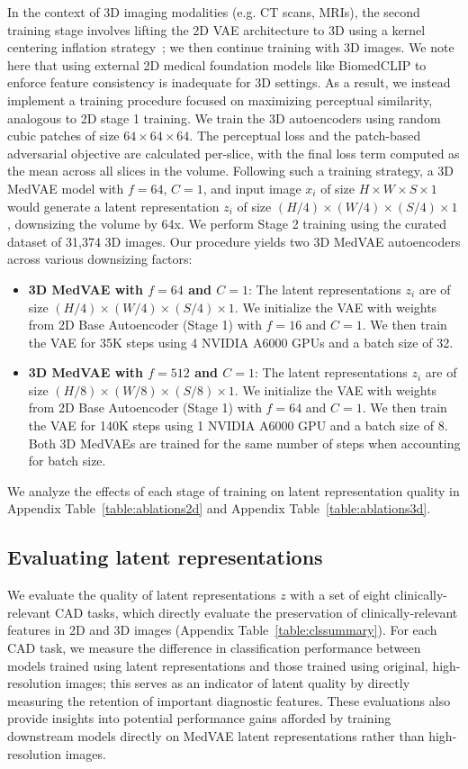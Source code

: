 In the context of 3D imaging modalities (e.g. CT scans, MRIs), the second training stage involves lifting the 2D VAE architecture to 3D using a kernel centering inflation strategy~\cite{zhang2022adapting}; we then continue training with 3D images. We note here that using external 2D medical foundation models like BiomedCLIP to enforce feature consistency is inadequate for 3D settings. As a result, we instead implement a training procedure focused on maximizing perceptual similarity, analogous to 2D stage 1 training. We train the 3D autoencoders using random cubic patches of size $64 \times 64 \times 64$. The perceptual loss and the patch-based adversarial objective are calculated per-slice, with the final loss term computed as the mean across all slices in the volume. Following such a training strategy, a 3D MedVAE model with $f = 64$, $C = 1$, and input image $x_i$ of size $H \times W \times S \times 1$ would generate a latent representation $z_i$ of size $(H/4) \times (W/4) \times (S/4) \times 1$, downsizing the volume by 64x. We perform Stage 2 training using the curated dataset of 31,374 3D images. Our procedure yields two 3D MedVAE autoencoders across various downsizing factors: 
\begin{itemize}
\item \textbf{3D MedVAE with $f=64$ and $C=1$}: The latent representations $z_i$ are of size $(H/4) \times (W/4) \times (S/4) \times 1$. We initialize the VAE with weights from 2D Base Autoencoder (Stage 1) with $f=16$ and $C=1$. We then train the VAE for 35K steps using 4 NVIDIA A6000 GPUs and a batch size of 32.
\item \textbf{3D MedVAE with $f=512$ and $C=1$}: The latent representations $z_i$ are of size $(H/8) \times (W/8) \times (S/8) \times 1$. We initialize the VAE with weights from 2D Base Autoencoder (Stage 1) with $f=64$ and $C=1$. We then train the VAE for 140K steps using 1 NVIDIA A6000 GPU and a batch size of 8. Both 3D MedVAEs are trained for the same number of steps when accounting for batch size. 
\end{itemize}

We analyze the effects of each stage of training on latent representation quality in Appendix Table~\ref{table:ablations2d} and Appendix Table~\ref{table:ablations3d}. 


\subsection{Evaluating latent representations}
We evaluate the quality of latent representations $z$ with a set of eight clinically-relevant CAD tasks, which directly evaluate the preservation of clinically-relevant features in 2D and 3D images (Appendix Table~\ref{table:clssummary}). For each CAD task, we measure the difference in classification performance between models trained using latent representations and those trained using original, high-resolution images; this serves as an indicator of latent quality by directly measuring the retention of important diagnostic features. These evaluations also provide insights into potential performance gains afforded by training downstream models directly on MedVAE latent representations rather than high-resolution images.

